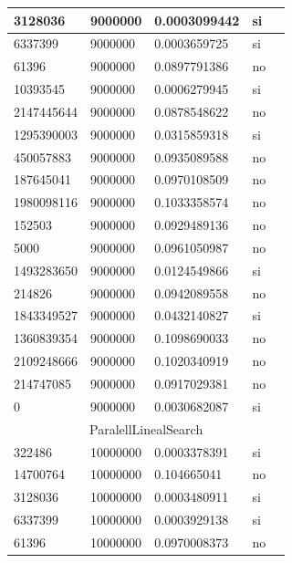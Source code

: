 \documentclass[12pt, fleqn]{article}                             %
\theoremstyle{break}                                            %
\begin{document}
\begin{longtable}{|m{5em}|m{5em}|m{10em}|m{5em}|@{}m{0pt}@{}}
            3128036& 9000000  & 0.0003099442 & si &\\[1em]    \hline
            6337399& 9000000  & 0.0003659725 & si &\\[1em]    \hline
            61396& 9000000  & 0.0897791386 & no &\\[1em]    \hline
            10393545& 9000000  & 0.0006279945 & si &\\[1em]    \hline
            2147445644& 9000000  & 0.0878548622 & no &\\[1em]    \hline
            1295390003& 9000000  & 0.0315859318 & si &\\[1em]    \hline
            450057883& 9000000  & 0.0935089588 & no &\\[1em]    \hline
            187645041& 9000000  & 0.0970108509 & no &\\[1em]    \hline
            1980098116& 9000000  & 0.1033358574 & no &\\[1em]    \hline
            152503& 9000000  & 0.0929489136 & no &\\[1em]    \hline
            5000& 9000000  & 0.0961050987 & no &\\[1em]    \hline
            1493283650& 9000000  & 0.0124549866 & si &\\[1em]    \hline
            214826& 9000000  & 0.0942089558 & no &\\[1em]    \hline
            1843349527& 9000000  & 0.0432140827 & si &\\[1em]    \hline
            1360839354& 9000000  & 0.1098690033 & no &\\[1em]    \hline
            2109248666& 9000000  & 0.1020340919 & no &\\[1em]    \hline
            214747085& 9000000  & 0.0917029381 & no &\\[1em]    \hline
            0& 9000000  & 0.0030682087 & si &\\[1em]    \hline
            \multicolumn{5}{|c|}{ParalellLinealSearch}   \\          \hline
            322486& 10000000  & 0.0003378391 & si &\\[1em]    \hline
            14700764& 10000000  & 0.104665041 & no &\\[1em]    \hline
            3128036& 10000000  & 0.0003480911 & si &\\[1em]    \hline
            6337399& 10000000  & 0.0003929138 & si &\\[1em]    \hline
            61396& 10000000  & 0.0970008373 & no &\\[1em]    \hline

\end{longtable}
\end{document}

